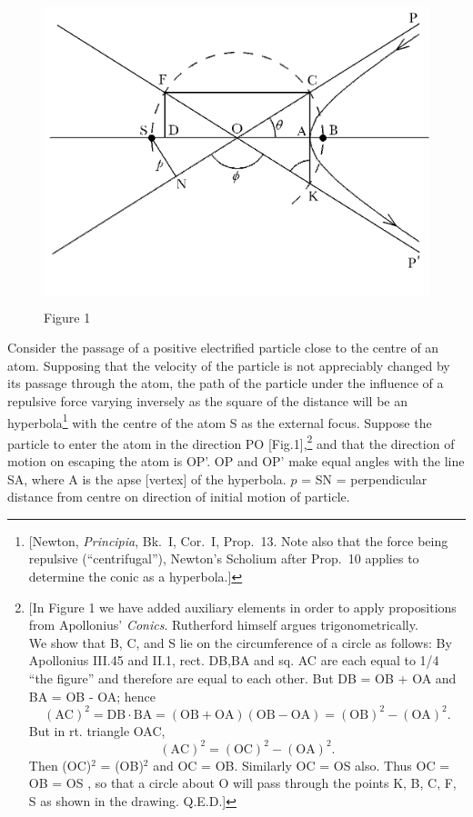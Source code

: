%
\begin{figure}[h]
  \begin{center}
    \includegraphics[width=4.65625in,height=3.5in]{images/04_rutherford/image005.png}
  \end{center}
    \caption*{Figure 1}
\end{figure}
%

Consider the passage of a positive electrified particle close to the
centre of an atom. Supposing that the velocity of the particle is not
appreciably changed by its passage through the atom, the path of the
particle under the influence of a repulsive force varying inversely as
the square of the distance will be an hyperbola\footnote{{[}Newton,
  \emph{Principia}, Bk.~I, Cor.~I, Prop.~13. Note also that the force being
  repulsive (``centrifugal''), Newton's Scholium after Prop.\ 10 applies
  to determine the conic as a hyperbola.{]}} with the centre of the atom
S as the external focus. Suppose the particle to enter the atom in the
direction PO {[}Fig.1{]},\footnote{{[}In Figure 1 we have added
  auxiliary elements in order to apply propositions from Apollonius'
  \emph{Conics}. Rutherford himself argues trigonometrically.\\
  We show that B, C, and S lie on the circumference of a circle as follows: 
  By Apollonius III.45 and II.1,
  rect. DB,BA and sq. AC are each equal to 1/4 ``the figure'' and
  therefore are equal to each other. But DB = OB + OA and BA = OB - OA;
  hence\\
	\begin{equation*}
   (\text{AC})^2 = \text{DB} \cdot \text{BA} = (\text{OB} + \text{OA})(\text{OB} - \text{OA}) = (\text{OB})^2 - (\text{OA})^2 .
	\end{equation*}
  But in rt. triangle OAC,
  \begin{equation*}
  (\text{AC})^2 = (\text{OC})^2 - (\text{OA})^2 .
  \end{equation*}
  Then (OC)$^2$ = (OB)$^2$ and OC = OB. Similarly OC = OS also. Thus OC = OB =
  OS , so that a circle about O will pass through the points K, B, C, F,
  S as shown in the drawing. Q.E.D.{]}} and that the direction of motion
on escaping the atom is OP'. OP and OP' make equal angles with the line
SA, where A is the apse {[}vertex{]} of the hyperbola. $p$ = SN =
perpendicular distance from centre on direction of initial motion of
particle.


